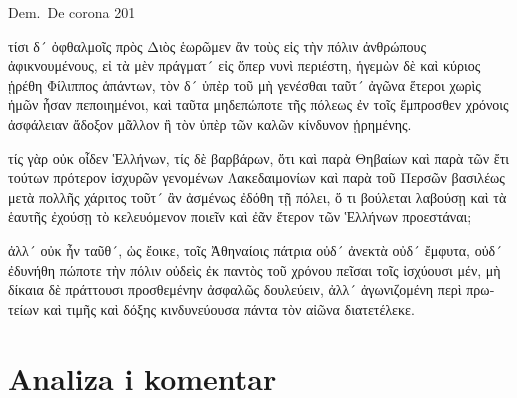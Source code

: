 Dem.\ De corona 201


\medskip


{\large

\begin{greek}

\noindent τίσι δ´ ὀφθαλμοῖς πρὸς Διὸς ἑωρῶμεν ἂν τοὺς εἰς τὴν πόλιν ἀνθρώπους ἀφικνουμένους, εἰ τὰ μὲν πράγματ´ εἰς ὅπερ νυνὶ περιέστη, ἡγεμὼν δὲ καὶ κύριος ᾑρέθη Φίλιππος ἁπάντων, τὸν δ´ ὑπὲρ τοῦ μὴ γενέσθαι ταῦτ´ ἀγῶνα ἕτεροι χωρὶς ἡμῶν ἦσαν πεποιημένοι, καὶ ταῦτα μηδεπώποτε τῆς πόλεως ἐν τοῖς ἔμπροσθεν χρόνοις ἀσφάλειαν ἄδοξον μᾶλλον ἢ τὸν ὑπὲρ τῶν καλῶν κίνδυνον ᾑρημένης.

τίς γὰρ οὐκ οἶδεν Ἑλλήνων, τίς δὲ βαρβάρων, ὅτι καὶ παρὰ Θηβαίων καὶ παρὰ τῶν ἔτι τούτων πρότερον ἰσχυρῶν γενομένων Λακεδαιμονίων καὶ παρὰ τοῦ Περσῶν βασιλέως μετὰ πολλῆς χάριτος τοῦτ´ ἂν ἀσμένως ἐδόθη τῇ πόλει, ὅ τι βούλεται λαβούσῃ καὶ τὰ ἑαυτῆς ἐχούσῃ τὸ κελευόμενον ποιεῖν καὶ ἐᾶν ἕτερον τῶν Ἑλλήνων προεστάναι;

ἀλλ´ οὐκ ἦν ταῦθ´, ὡς ἔοικε, τοῖς Ἀθηναίοις πάτρια οὐδ´ ἀνεκτὰ οὐδ´ ἔμφυτα, οὐδ´ ἐδυνήθη πώποτε τὴν πόλιν οὐδεὶς ἐκ παντὸς τοῦ χρόνου πεῖσαι τοῖς ἰσχύουσι μέν, μὴ δίκαια δὲ πράττουσι προσθεμένην ἀσφαλῶς δουλεύειν, ἀλλ´ ἀγωνιζομένη περὶ πρωτείων καὶ τιμῆς καὶ δόξης κινδυνεύουσα πάντα τὸν αἰῶνα διατετέλεκε.

\end{greek}

}


\section*{Analiza i komentar}


